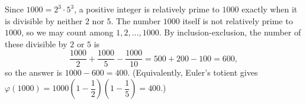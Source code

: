 Since $1000=2^3\cdot5^3$, a positive integer is relatively prime to $1000$ exactly when it is divisible by neither $2$ nor $5$. The number $1000$ itself is not relatively prime to $1000$, so we may count among $1,2,\dots,1000$. By inclusion-exclusion, the number of these divisible by $2$ or $5$ is
\[\dfrac{1000}{2}+\dfrac{1000}{5}-\dfrac{1000}{10}=500+200-100=600,\]
so the answer is $1000-600=\boxed{400}$. (Equivalently, Euler's totient gives $\varphi(1000)=1000\left(1-\dfrac{1}{2}\right)\left(1-\dfrac{1}{5}\right)=400$.)
